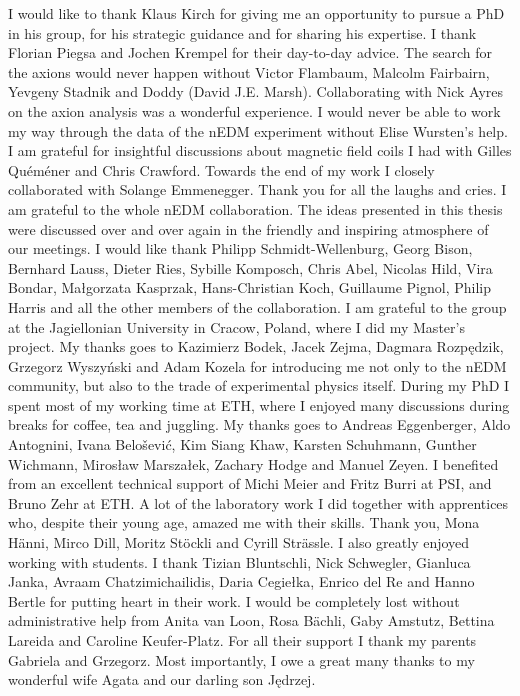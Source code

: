 I would like to thank Klaus Kirch for giving me an opportunity to pursue a PhD in his group, for his strategic guidance and for sharing his expertise.
I thank Florian Piegsa and Jochen Krempel for their day-to-day advice.
The search for the axions would never happen without Victor Flambaum, Malcolm Fairbairn, Yevgeny Stadnik and Doddy (David J.E. Marsh).
Collaborating with Nick Ayres on the axion analysis was a wonderful experience.
I would never be able to work my way through the data of the nEDM experiment without Elise Wursten's help.
I am grateful for insightful discussions about magnetic field coils I had with Gilles Quéméner and Chris Crawford.
Towards the end of my work I closely collaborated with Solange Emmenegger.
Thank you for all the laughs and cries.
I am grateful to the whole nEDM collaboration.
The ideas presented in this thesis were discussed over and over again in the friendly and inspiring atmosphere of our meetings.
I would like thank
Philipp Schmidt-Wellenburg,
Georg Bison,
Bernhard Lauss,
Dieter Ries,
Sybille Komposch,
Chris Abel,
Nicolas Hild,
Vira Bondar,
Małgorzata Kasprzak,
Hans-Christian Koch,
Guillaume Pignol,
Philip Harris
and all the other members of the collaboration.
I am grateful to the group at the Jagiellonian University in Cracow, Poland, where I did my Master's project.
My thanks goes to
Kazimierz Bodek,
Jacek Zejma,
Dagmara Rozpędzik,
Grzegorz Wyszyński and
Adam Kozela
for introducing me not only to the nEDM community, but also to the trade of experimental physics itself.
During my PhD I spent most of my working time at ETH, where I enjoyed many discussions during breaks for coffee, tea and juggling.
My thanks goes to
Andreas Eggenberger,
Aldo Antognini,
Ivana Belo\v{s}ević,
Kim Siang Khaw,
Karsten Schuhmann,
Gunther Wichmann,
Mirosław Marszałek,
Zachary Hodge and
Manuel Zeyen.
I benefited from an excellent technical support of Michi Meier and Fritz Burri at PSI, and Bruno Zehr at ETH\@.
A lot of the laboratory work I did together with apprentices who, despite their young age, amazed me with their skills.
Thank you,
Mona Hänni,
Mirco Dill,
Moritz Stöckli and
Cyrill Strässle.
I also greatly enjoyed working with students.
I thank
Tizian Bluntschli,
Nick Schwegler,
Gianluca Janka,
Avraam Chatzimichailidis,
Daria Cegiełka,
Enrico del Re and
Hanno Bertle for putting heart in their work.
I would be completely lost without administrative help from Anita van Loon, Rosa Bächli,
Gaby Amstutz, Bettina Lareida and Caroline Keufer-Platz.
For all their support I thank my parents Gabriela and Grzegorz.
Most importantly, I owe a great many thanks to my wonderful wife Agata and our darling son Jędrzej.

